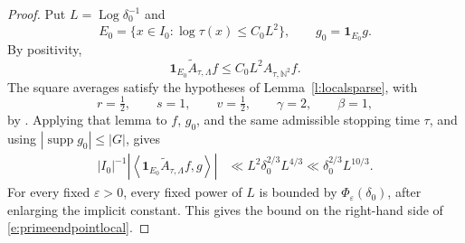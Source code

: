 \documentclass[12pt,reqno]{amsart}
\numberwithin{equation}{section}
\theoremstyle{definition}
\theoremstyle{remark}
\newcommand{\Log}{\operatorname{Log}}
\begin{document}
\begin{proof}
Put \(L=\Log\delta_0^{-1}\) and
\[
 E_0=\{x\in I_0:\log\tau(x)\leq C_0L^2\},
 \qquad g_0=\mathbf1_{E_0}g.
\]
By positivity,
\[
 \mathbf1_{E_0}\widetilde A_{\tau,\Lambda}f
 \leq C_0L^2 A_{\tau,\mathbb N^2}f.
\]
The square averages satisfy the hypotheses of
Lemma~\ref{l:localsparse}, with
\[
 r=\tfrac12,\qquad s=1,\qquad v=\tfrac12,\qquad
 \gamma=2,\qquad\beta=1,
\]
by \cite[Lemmas~5.2--5.6]{LHF}.  Applying that lemma to \(f\), \(g_0\),
and the same admissible stopping time \(\tau\), and using
\(|\operatorname{supp}g_0|\leq|G|\), gives
\begin{align}\label{e:sparse1}
 |I_0|^{-1}
 \left|
 \left\langle
 \mathbf1_{E_0}\widetilde A_{\tau,\Lambda}f,g
 \right\rangle
 \right|
 &\ll
 L^2\delta_0^{2/3}L^{4/3}
 \ll \delta_0^{2/3}L^{10/3}.
\end{align}
For every fixed \(\varepsilon>0\), every fixed power of \(L\) is bounded by
\(\Phi_{\varepsilon}(\delta_0)\), after enlarging the implicit constant.
This gives the bound on  the right-hand side of
\eqref{e:primeendpointlocal}.


\end{proof}
\end{document}
